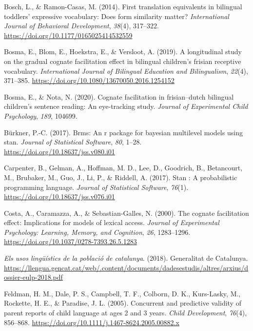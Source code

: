\documentclass[
]{article}
\newlength{\cslhangindent}
\newlength{\cslentryspacingunit} %
\newenvironment{CSLReferences}[2] %
 {%
  \setlength{\parindent}{0pt}
  \ifodd #1
  \let\oldpar\par
  \def\par{\hangindent=\cslhangindent\oldpar}
  \fi
  \setlength{\parskip}{#2\cslentryspacingunit}
 }%
 {}
\begin{document}
\begin{CSLReferences}{1}{0}
\leavevmode{}%
Bosch, L., \& Ramon-Casas, M. (2014). First translation equivalents in
bilingual toddlers' expressive vocabulary: Does form similarity matter?
\emph{International Journal of Behavioral Development}, \emph{38}(4),
317--322. \url{https://doi.org/10.1177/0165025414532559}

\leavevmode{}%
Bosma, E., Blom, E., Hoekstra, E., \& Versloot, A. (2019). A
longitudinal study on the gradual cognate facilitation effect in
bilingual children's frisian receptive vocabulary. \emph{International
Journal of Bilingual Education and Bilingualism}, \emph{22}(4),
371--385. \url{https://doi.org/10.1080/13670050.2016.1254152}

\leavevmode{}%
Bosma, E., \& Nota, N. (2020). Cognate facilitation in frisian--dutch
bilingual children's sentence reading: An eye-tracking study.
\emph{Journal of Experimental Child Psychology}, \emph{189}, 104699.

\leavevmode{}%
Bürkner, P.-C. (2017). Brms: An r package for bayesian multilevel models
using stan. \emph{Journal of Statistical Software}, \emph{80}, 1--28.
\url{https://doi.org/10.18637/jss.v080.i01}

\leavevmode{}%
Carpenter, B., Gelman, A., Hoffman, M. D., Lee, D., Goodrich, B.,
Betancourt, M., Brubaker, M., Guo, J., Li, P., \& Riddell, A. (2017).
Stan : A probabilistic programming language. \emph{Journal of
Statistical Software}, \emph{76}(1).
\url{https://doi.org/10.18637/jss.v076.i01}

\leavevmode{}%
Costa, A., Caramazza, A., \& Sebastian-Galles, N. (2000). The cognate
facilitation effect: Implications for models of lexical access.
\emph{Journal of Experimental Psychology: Learning, Memory, and
Cognition}, \emph{26}, 1283--1296.
\url{https://doi.org/10.1037/0278-7393.26.5.1283}

\leavevmode{}%
\emph{Els usos lingüístics de la població de catalunya}. (2018).
Generalitat de Catalunya.
\url{https://llengua.gencat.cat/web/.content/documents/dadesestudis/altres/arxius/dossier-eulp-2018.pdf}

\leavevmode{}%
Feldman, H. M., Dale, P. S., Campbell, T. F., Colborn, D. K.,
Kurs-Lasky, M., Rockette, H. E., \& Paradise, J. L. (2005). Concurrent
and predictive validity of parent reports of child language at ages 2
and 3 years. \emph{Child Development}, \emph{76}(4), 856--868.
\url{https://doi.org/10.1111/j.1467-8624.2005.00882.x}


\end{CSLReferences}
\end{document}
